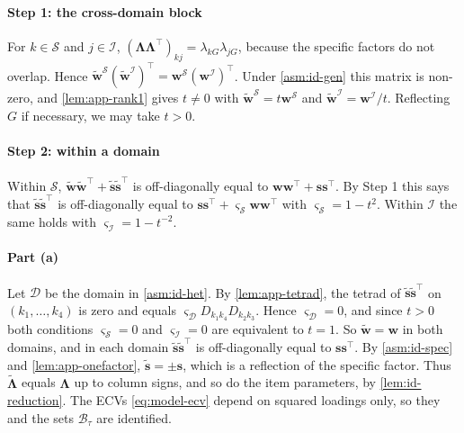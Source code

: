 \paragraph{Step 1: the cross-domain block}
For $k\in\mathcal S$ and $j\in\mathcal I$, $(\bm\Lambda\bm\Lambda^\top)_{kj}=\lambda_{kG}\lambda_{jG}$, because the specific factors do not overlap. Hence $\tilde{\bm w}^{\mathcal S}(\tilde{\bm w}^{\mathcal I})^\top=\bm w^{\mathcal S}(\bm w^{\mathcal I})^\top$. Under \cref{asm:id-gen} this matrix is non-zero, and \cref{lem:app-rank1} gives $t\neq0$ with $\tilde{\bm w}^{\mathcal S}=t\bm w^{\mathcal S}$ and $\tilde{\bm w}^{\mathcal I}=\bm w^{\mathcal I}/t$. Reflecting $G$ if necessary, we may take $t>0$.

\paragraph{Step 2: within a domain}
Within $\mathcal S$, $\tilde{\bm w}\tilde{\bm w}^\top+\tilde{\bm s}\tilde{\bm s}^\top$ is off-diagonally equal to $\bm w\bm w^\top+\bm s\bm s^\top$. By Step 1 this says that $\tilde{\bm s}\tilde{\bm s}^\top$ is off-diagonally equal to $\bm s\bm s^\top+\varsigma_{\mathcal S}\bm w\bm w^\top$ with $\varsigma_{\mathcal S}=1-t^2$. Within $\mathcal I$ the same holds with $\varsigma_{\mathcal I}=1-t^{-2}$.

\paragraph{Part (a)}
Let $\mathcal D$ be the domain in \cref{asm:id-het}. By \cref{lem:app-tetrad}, the tetrad of $\tilde{\bm s}\tilde{\bm s}^\top$ on $(k_1,\dots,k_4)$ is zero and equals $\varsigma_{\mathcal D}D_{k_1k_4}D_{k_2k_3}$. Hence $\varsigma_{\mathcal D}=0$, and since $t>0$ both conditions $\varsigma_{\mathcal S}=0$ and $\varsigma_{\mathcal I}=0$ are equivalent to $t=1$. So $\tilde{\bm w}=\bm w$ in both domains, and in each domain $\tilde{\bm s}\tilde{\bm s}^\top$ is off-diagonally equal to $\bm s\bm s^\top$. By \cref{asm:id-spec} and \cref{lem:app-onefactor}, $\tilde{\bm s}=\pm\bm s$, which is a reflection of the specific factor. Thus $\tilde{\bm\Lambda}$ equals $\bm\Lambda$ up to column signs, and so do the item parameters, by \cref{lem:id-reduction}. The ECVs \eqref{eq:model-ecv} depend on squared loadings only, so they and the sets $\mathcal B_\tau$ are identified.

